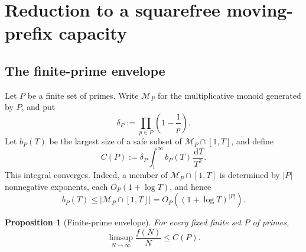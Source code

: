 \documentclass[11pt]{article}
\numberwithin{equation}{section}
\theoremstyle{plain}
\newtheorem{proposition}[theorem]{Proposition}
\newcommand{\1}{\mathbf 1}
\newcommand{\dd}{\,\mathrm d}
\newcommand{\cM}{\mathcal M}
\begin{document}
\section{Reduction to a squarefree moving-prefix capacity}
\label{sec:reduction}

\subsection{The finite-prime envelope}

Let $P$ be a finite set of primes.  Write $\cM_P$ for the multiplicative
monoid generated by $P$, and put
\[
 \delta_P:=\prod_{p\in P}\left(1-\frac1p\right).
\]
Let $b_P(T)$ be the largest size of a safe subset of
$\cM_P\cap[1,T]$, and define
\begin{equation}\label{eq:finite-envelope-capacity}
 C(P):=\delta_P\int_1^\infty b_P(T)\frac{\dd T}{T^2}.
\end{equation}
This integral converges.  Indeed, a member of $\cM_P\cap[1,T]$ is
determined by $|P|$ nonnegative exponents, each $O_P(1+\log T)$, and hence
\begin{equation}\label{eq:smooth-count}
 b_P(T)\le|\cM_P\cap[1,T]|=O_P((1+\log T)^{|P|}).
\end{equation}

\begin{proposition}[Finite-prime envelope]\label{prop:finite-envelope}
For every fixed finite set $P$ of primes,
\begin{equation}\label{eq:finite-envelope}
 \limsup_{N\to\infty}\frac{f(N)}N\le C(P).
\end{equation}
\end{proposition}
\end{document}

